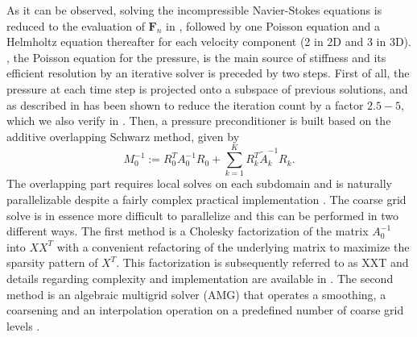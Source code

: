 \documentclass{sig-alternate}
\begin{document}
As it can be observed, solving the incompressible Navier-Stokes equations is reduced 
to the evaluation of $\mathbf{F}_n$ in , followed by one Poisson 
equation and a Helmholtz equation thereafter for each velocity component (2 in 2D and 3 in 3D). 
, the Poisson equation for the pressure, is the main 
source of stiffness and its efficient resolution by an iterative solver is preceded 
by two steps. First of all, the pressure at each time step is projected onto a 
subspace of previous solutions, and as described in \cite{Fischer1998} has been shown 
to reduce the iteration count by a factor $2.5-5$, which we also verify in .
Then, a pressure preconditioner is built based on the additive overlapping Schwarz 
method, given by 
\begin{equation}
 M_0^{-1} := R_0^T A_{0}^{-1} R_0 + \sum_{k=1}^{K} R_k^T \tilde{A}_k^{-1} R_k.
\end{equation}
The overlapping part requires local solves on each subdomain and is naturally parallelizable 
despite a fairly complex practical implementation \cite{Fischer199784,Fischer2005}. 
The coarse grid solve is in essence more difficult to parallelize and this can be 
performed in two different ways. The first 
method is a Cholesky factorization of the matrix $A_0^{-1}$ into $XX^T$ with a 
convenient refactoring of the underlying matrix to maximize the sparsity pattern 
of $X^T$. This factorization is subsequently referred to as XXT and details 
regarding complexity and implementation are available in \cite{Tufo2001151}. The 
second method is an algebraic multigrid solver (AMG) that operates a smoothing, 
a coarsening and an interpolation operation on a predefined number of coarse grid 
levels \cite{LottesAMG}. 
\end{document}
